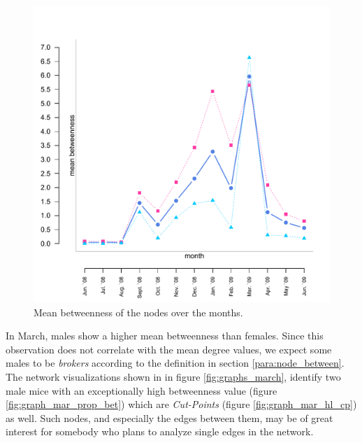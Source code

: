 \begin{figure}[htpb]
\begin{center}
  \includegraphics[width=.6\textwidth]{assets/pdf/long_betweenness.pdf}
  \caption[Mean betweenness of the nodes over the months]{Mean betweenness of the nodes over the months.}
  \label{fig:long_betweenness}
\end{center}
\end{figure}

In March, males show a higher mean betweenness than females. Since this observation does not correlate with the mean degree values, we expect some males to be \textit{brokers} according to the definition in section \ref{para:node_between}. The network visualizations shown in in figure \ref{fig:graphs_march}, identify two male mice with an exceptionally high betweenness value (figure \ref{fig:graph_mar_prop_bet}) which are  \textit{Cut-Points} (figure \ref{fig:graph_mar_hl_cp}) as well. Such nodes, and especially the edges between them, may be of great interest for somebody who plans to analyze single edges in the network.   

